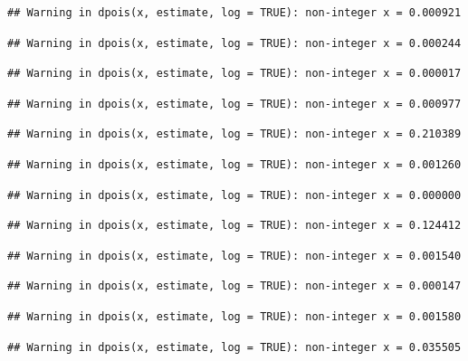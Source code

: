 \documentclass[]{article}
\begin{document}
\begin{verbatim}
## Warning in dpois(x, estimate, log = TRUE): non-integer x = 0.000921
\end{verbatim}

\begin{verbatim}
## Warning in dpois(x, estimate, log = TRUE): non-integer x = 0.000244
\end{verbatim}

\begin{verbatim}
## Warning in dpois(x, estimate, log = TRUE): non-integer x = 0.000017
\end{verbatim}

\begin{verbatim}
## Warning in dpois(x, estimate, log = TRUE): non-integer x = 0.000977
\end{verbatim}

\begin{verbatim}
## Warning in dpois(x, estimate, log = TRUE): non-integer x = 0.210389
\end{verbatim}

\begin{verbatim}
## Warning in dpois(x, estimate, log = TRUE): non-integer x = 0.001260
\end{verbatim}

\begin{verbatim}
## Warning in dpois(x, estimate, log = TRUE): non-integer x = 0.000000
\end{verbatim}

\begin{verbatim}
## Warning in dpois(x, estimate, log = TRUE): non-integer x = 0.124412
\end{verbatim}

\begin{verbatim}
## Warning in dpois(x, estimate, log = TRUE): non-integer x = 0.001540
\end{verbatim}

\begin{verbatim}
## Warning in dpois(x, estimate, log = TRUE): non-integer x = 0.000147
\end{verbatim}

\begin{verbatim}
## Warning in dpois(x, estimate, log = TRUE): non-integer x = 0.001580
\end{verbatim}

\begin{verbatim}
## Warning in dpois(x, estimate, log = TRUE): non-integer x = 0.035505
\end{verbatim}
\end{document}
